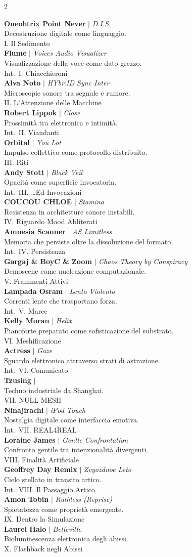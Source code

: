 \vspace{0em}

\newcommand{\trackentry}[4]{%
    {\fontsize{8pt}{10pt}\selectfont\textbf{#1} $|$ \textit{#2}}\\[-0.1em]
    {\fontsize{6.5pt}{7pt}\selectfont #3}\\[-0.1em]
    {\fontsize{8pt}{10pt}\selectfont\color{nullmesh-ghost}#4}\\[0.1em]
}

\setlength{\columnsep}{1em}
\setlength{\multicolsep}{0.5em}
\begin{multicols}{2}
\setlength{\parskip}{0pt}
\setlength{\parindent}{0pt}

\trackentry{Oneohtrix Point Never}{D.I.S.}{Decostruzione digitale come linguaggio.}{I. Il Sedimento}
\trackentry{Flume}{Voices Audio Visualizer}{Visualizzazione della voce come dato grezzo.}{Int.\ I. Chiacchieroni}
\trackentry{Alva Noto}{HYbr:ID Sync Inter}{Microscopie sonore tra segnale e rumore.}{II. L'Attenzione delle Macchine}
\trackentry{Robert Lippok}{Close}{Prossimità tra elettronica e intimità.}{Int.\ II. Viandanti}
\trackentry{Orbital}{You Lot}{Impulso collettivo come protocollo distribuito.}{III. Riti}
\trackentry{Andy Stott}{Black Veil}{Opacità come superficie invocatoria.}{Int.\ III. \dots Ed Invocazioni}
\trackentry{COUCOU CHLOE}{Stamina}{Resistenza in architetture sonore instabili.}{IV. Riguardo Mood Abliterati}
\trackentry{Amnesia Scanner}{AS Limitless}{Memoria che persiste oltre la dissoluzione del formato.}{Int.\ IV. Persistenza}
\trackentry{Gargaj \& BoyC \& Zoom}{Chaos Theory by Conspiracy}{Demoscene come nucleazione computazionale.}{V. Frammenti Attivi}
\trackentry{Lampada Osram}{Lento Violento}{Correnti lente che trasportano forza.}{Int.\ V. Maree}
\trackentry{Kelly Moran}{Helix}{Pianoforte preparato come sofisticazione del substrato.}{VI. Meshificazione}
\trackentry{Actress}{Gaze}{Sguardo elettronico attraverso strati di astrazione.}{Int.\ VI. Comunicato}
\trackentry{Tzusing}{}{Techno industriale da Shanghai.}{VII. NULL MESH}
\trackentry{Ninajirachi}{iPod Touch}{Nostalgia digitale come interfaccia emotiva.}{Int.\ VII. REAL4REAL}
\trackentry{Loraine James}{Gentle Confrontation}{Confronto gentile tra intenzionalità divergenti.}{VIII. Finalità Artificiale}
\trackentry{Geoffrey Day Remix}{Zvyozdnoe Leto}{Cielo stellato in transito artico.}{Int.\ VIII. Il Passaggio Artico}
\trackentry{Amon Tobin}{Ruthless (Reprise)}{Spietatezza come proprietà emergente.}{IX. Dentro la Simulazione}
\trackentry{Laurel Halo}{Belleville}{Bioluminescenza elettronica degli abissi.}{X. Flashback negli Abissi}

\end{multicols}